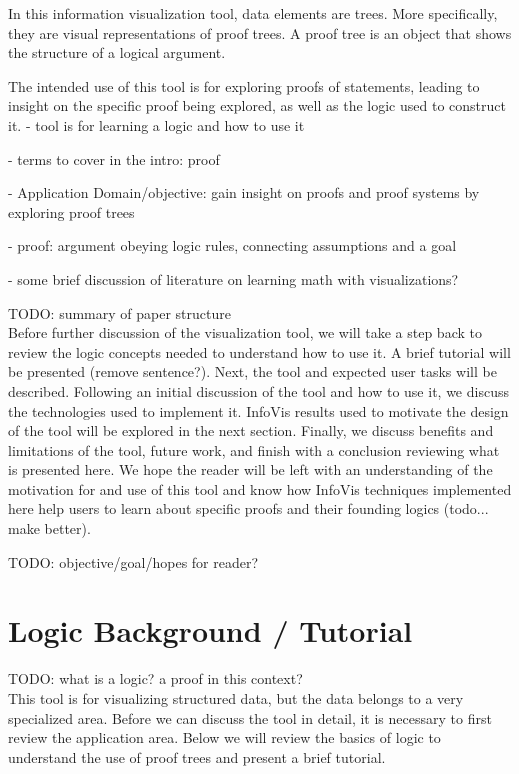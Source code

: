 \documentclass[conference]{IEEEtran}
\begin{document}
In this information visualization tool, data elements are trees. More specifically, they are visual representations of proof trees. A proof tree is an object that shows the structure of a logical argument.

The intended use of this tool is for exploring proofs of statements, leading to insight on the specific proof being explored, as well as the logic used to construct it.
- tool is for learning a logic and how to use it

- terms to cover in the intro: proof

- Application Domain/objective: gain insight on proofs and proof systems by exploring proof trees

- proof: argument obeying logic rules, connecting assumptions and a goal

- some brief discussion of literature on learning math with visualizations?

TODO: summary of paper structure \\

Before further discussion of the visualization tool, we will take a step back to review the logic concepts needed to understand how to use it. A brief tutorial will be presented (remove sentence?). Next, the tool and expected user tasks will be described. Following an initial discussion of the tool and how to use it, we discuss the technologies used to implement it. InfoVis results used to motivate the design of the tool will be explored in the next section. Finally, we discuss benefits and limitations of the tool, future work, and finish with a conclusion reviewing what is presented here. We hope the reader will be left with an understanding of the motivation for and use of this tool and know how InfoVis techniques implemented here help users to learn about specific proofs and their founding logics (todo... make better).

TODO: objective/goal/hopes for reader? \\



\section{Logic Background / Tutorial}

TODO: what is a logic? a proof in this context? \\

This tool is for visualizing structured data, but the data belongs to a very specialized area. Before we can discuss the tool in detail, it is necessary to first review the application area. Below we will review the basics of logic to understand the use of proof trees and present a brief tutorial.
\end{document}
